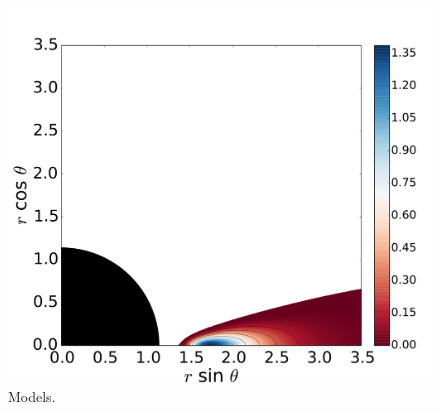 \documentclass{aa}
\begin{document}
\begin{figure}
\includegraphics[scale=0.16]{figures/fig2_5_3.pdf}
\caption{Models.}
           \label{models}%
 \end{figure}
 
\end{document}
